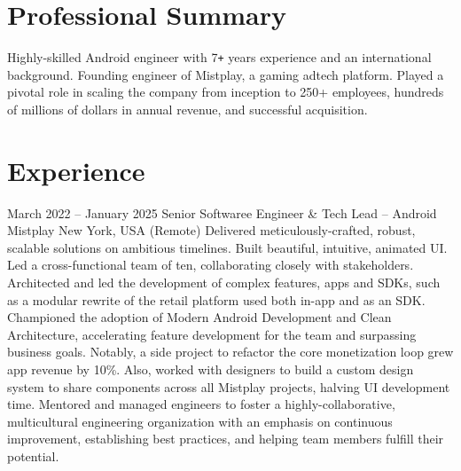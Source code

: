 \documentclass[10pt,a4paper,sans]{moderncv} %
\newcommand{\vs}[0]{\smallskip}
\begin{document}
\makecvtitle %
\vspace{-0.9cm}


\section{Professional Summary}
\vspace{-0.8mm}
Highly-skilled Android engineer with 7\texttt{+} years experience and an international background. Founding engineer of Mistplay, a gaming adtech platform. Played a pivotal role in scaling the company from inception to 250+ employees, hundreds of millions of dollars in annual revenue, and successful acquisition. 


\section{Experience}


\cventry
{March 2022 -- January 2025}
{Senior Softwaree Engineer \& Tech Lead -- Android}
{{Mistplay}}
{New York, USA (Remote)}
{}{
	Delivered meticulously-crafted, robust, scalable solutions on ambitious timelines. Built beautiful, intuitive, animated UI.
	Led a cross-functional team of ten, collaborating closely with stakeholders.
	Architected and led the development of complex features, apps and SDKs, such as a modular rewrite of the retail platform used both in-app and as an SDK.
	Championed the adoption of Modern Android Development and Clean Architecture, accelerating feature development for the team and surpassing business goals. Notably, a side project to refactor the core monetization loop grew app revenue by 10\%. Also, worked with designers to build a custom design system to share components across all Mistplay projects, halving UI development time.
	Mentored and managed engineers to foster a highly-collaborative, multicultural engineering organization with an emphasis on continuous improvement, establishing best practices, and helping team members fulfill their potential.
}\vs
\end{document}
